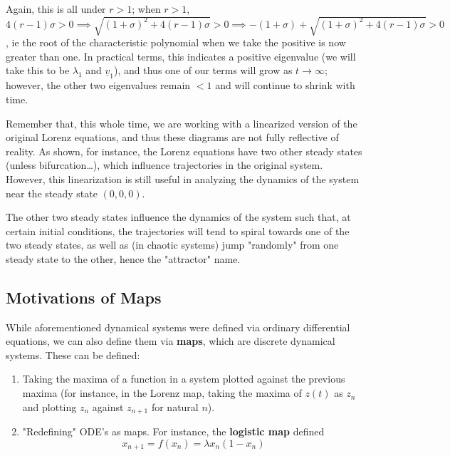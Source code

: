 \documentclass[12pt]{article}
\begin{document}
Again, this is all under $r > 1$; when $r>1$, $4(r-1)\sigma > 0 \implies \sqrt{(1+\sigma)^2 + 4(r-1)\sigma} >0 \implies -(1+\sigma) + \sqrt{(1+\sigma)^2 + 4(r-1)\sigma} > 0$, ie the root of the characteristic polynomial when we take the positive is now greater than one. In practical terms, this indicates a positive eigenvalue (we will take this to be $\lambda_1$ and $\underline{v}_1$), and thus one of our terms will grow as $t \to \infty$; however, the other two eigenvalues remain $<1$ and will continue to shrink with time.

Remember that, this whole time, we are working with a linearized version of the original Lorenz equations, and thus these diagrams are not fully reflective of reality. As shown, for instance, the Lorenz equations have two other steady states (unless bifurcation\dots), which influence trajectories in the original system. However, this linearization is still useful in analyzing the dynamics of the system near the steady state $(0,0,0)$.

The other two steady states influence the dynamics of the system such that, at certain initial conditions, the trajectories will tend to spiral towards one of the two steady states, as well as (in chaotic systems) jump "randomly" from one steady state to the other, hence the "attractor" name.

\subsection{Motivations of Maps}

While aforementioned dynamical systems were defined via ordinary differential equations, we can also define them via \textbf{maps}, which are discrete dynamical systems. These can be defined:
\begin{enumerate}
  \item Taking the maxima of a function in a system plotted against the previous maxima (for instance, in the Lorenz map, taking the maxima of $z(t)$ as $z_n$ and plotting $z_n$ against $z_{n+1}$ for natural $n$).
  \item "Redefining" ODE's as maps. For instance, the \textbf{logistic map} defined \[x_{n+1} = f(x_n) = \lambda x_n(1-x_n)\]
\end{enumerate}
\end{document}
